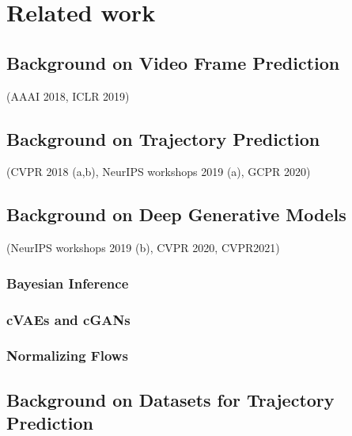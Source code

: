 \chapter{Related work}
\label{chap:related}
\minitoc\vspace{2ex}

\section{Background on Video Frame Prediction}
(AAAI 2018, ICLR 2019)


\section{Background on Trajectory Prediction}
(CVPR 2018 (a,b), NeurIPS workshops 2019 (a), GCPR 2020)


\section{Background on Deep Generative Models} (NeurIPS workshops 2019 (b),  CVPR 2020, CVPR2021)

\subsection{Bayesian Inference}
\subsection{cVAEs and cGANs}
\subsection{Normalizing Flows}


\section{Background on Datasets for Trajectory Prediction}